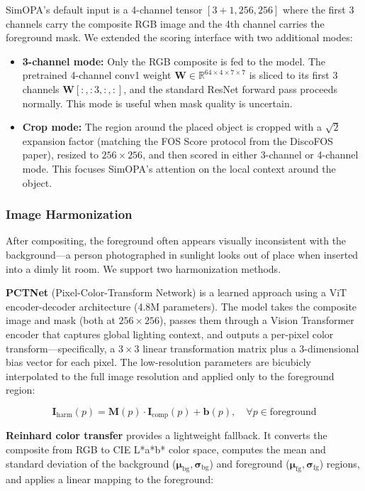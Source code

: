 \documentclass[10pt,twocolumn]{article}
\begin{document}
SimOPA's default input is a 4-channel tensor $[3+1, 256, 256]$ where the first 3 channels carry the composite RGB image and the 4th channel carries the foreground mask. We extended the scoring interface with two additional modes:

\begin{itemize}
    \item \textbf{3-channel mode:} Only the RGB composite is fed to the model. The pretrained 4-channel conv1 weight $\mathbf{W} \in \mathbb{R}^{64\times 4\times 7\times 7}$ is sliced to its first 3 channels $\mathbf{W}[:, :3, :, :]$, and the standard ResNet forward pass proceeds normally. This mode is useful when mask quality is uncertain.
    \item \textbf{Crop mode:} The region around the placed object is cropped with a $\sqrt{2}$ expansion factor (matching the FOS Score protocol from the DiscoFOS paper), resized to $256\times 256$, and then scored in either 3-channel or 4-channel mode. This focuses SimOPA's attention on the local context around the object.
\end{itemize}

\subsubsection{Image Harmonization}

After compositing, the foreground often appears visually inconsistent with the background---a person photographed in sunlight looks out of place when inserted into a dimly lit room. We support two harmonization methods.

\textbf{PCTNet} (Pixel-Color-Transform Network) is a learned approach using a ViT encoder-decoder architecture (4.8M parameters). The model takes the composite image and mask (both at $256\times 256$), passes them through a Vision Transformer encoder that captures global lighting context, and outputs a per-pixel color transform---specifically, a $3\times 3$ linear transformation matrix plus a 3-dimensional bias vector for each pixel. The low-resolution parameters are bicubicly interpolated to the full image resolution and applied only to the foreground region:

\begin{equation}
\mathbf{I}_{\text{harm}}(p) = \mathbf{M}(p) \cdot \mathbf{I}_{\text{comp}}(p) + \mathbf{b}(p), \quad \forall p \in \text{foreground}
\end{equation}

\textbf{Reinhard color transfer} provides a lightweight fallback. It converts the composite from RGB to CIE L*a*b* color space, computes the mean and standard deviation of the background ($\bm{\mu}_{\text{bg}}, \bm{\sigma}_{\text{bg}}$) and foreground ($\bm{\mu}_{\text{fg}}, \bm{\sigma}_{\text{fg}}$) regions, and applies a linear mapping to the foreground:
\end{document}

